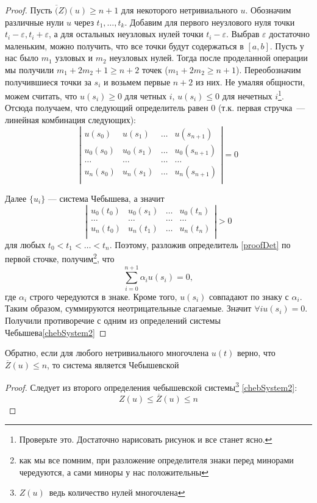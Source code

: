  \begin{proof}
Пусть $\overline(Z)(u) \geq n+1$ для некоторого нетривиального $u$. Обозначим различные нули $u$ через $t_1, …, t_k$. 
Добавим для первого неузлового нуля точки $t_i-\varepsilon, t_i+\varepsilon$, а для остальных неузловых нулей точки $t_i - \varepsilon$. Выбрав $\varepsilon$ достаточно маленьким, можно получить, что все точки будут содержаться в $[a,b]$. Пусть у нас было $m_1$ узловых и $m_2$ неузловых нулей. Тогда после проделанной операции мы получили $m_1 + 2m_2 + 1 \geq n+2$ точек ($m_1+2m_2 \geq n+1$). Переобозначим получившиеся точки за $s_i$ и возьмем первые $n+2$ из них. Не умаляя общности, можем считать, что $u(s_{i}) \geq 0$ для четных $i$, $u(s_{i}) \leq 0$ для нечетных $i$\footnote{Проверьте это. Достаточно нарисовать рисунок и все станет ясно.}. Отсюда получаем, что следующий определитель равен 0 (т.к. первая стручка — линейная комбинация следующих):
\begin{equation}
\label{proofDet}
\left| \begin{array}{cccc}
u(s_0) & u(s_1) & … & u(s_{n+1}) \\
u_0(s_0) & u_0(s_1) & … & u_0(s_{n+1})\\
… & … & … & …\\
u_n(s_0) & u_n(s_1) & … & u_n(s_{n+1})\\ 
\end{array}
\right| = 0
\end{equation}

Далее $\{u_i\}$ — система Чебышева, а значит 
$$ \left| \begin{array}{cccc}
u_0(t_0) & u_0(s_1) & … & u_0(t_{n})\\
… & … & … & …\\
u_n(t_0) & u_n(t_1) & … & u_n(t_{n})\\ 
\end{array}
\right| > 0
$$
для любых $t_0 < t_1 < … < t_n$. Поэтому, разложив определитель \eqref{proofDet} по первой сточке, получим\footnote{как мы все помним, при разложение определителя знаки перед минорами чередуются, а сами миноры у нас положительны}, что 
$$\sum\limits_{i=0}^{n+1} \alpha_iu(s_i) = 0,$$
где $\alpha_i$ строго чередуются в знаке. Кроме того, $u(s_i)$ совпадают по знаку с $\alpha_i$. Таким образом, суммируются неотрицательные слагаемые. Значит $\forall i u(s_i) = 0 $. Получили противоречие с одним из определений системы Чебышева\eqref{chebSystem2}  
 \end{proof}


\begin{thm}
Обратно, если для любого нетривиального многочлена $u(t)$ верно, что $\overline{Z}(u) \leq n$, то система является Чебышевской
\end{thm}
\begin{proof}
Следует из второго определения чебышевской системы\footnote{$Z(u)$ ведь количество нулей многочлена} \ref{chebSystem2}:
$$Z(u) \leq \overline{Z}(u) \leq n$$ 
\end{proof}
